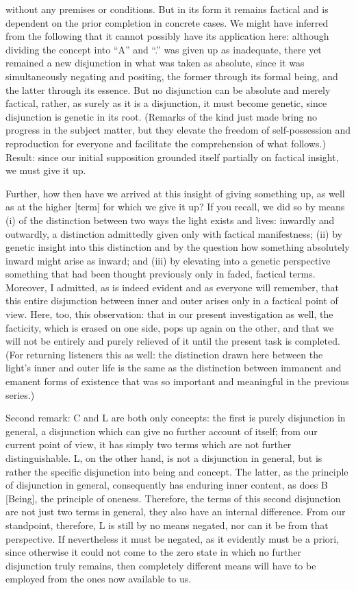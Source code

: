 without any premises or conditions.
But in its form it remains factical and is dependent
on the prior completion in concrete cases.
We might have inferred from the following
that it cannot possibly have its application here:
although dividing the concept
into “A” and “.” was given up as inadequate,
there yet remained a new disjunction
in what was taken as absolute,
since it was simultaneously negating and positing,
the former through its formal being,
and the latter through its essence.
But no disjunction can be absolute and merely factical,
rather, as surely as it is a disjunction,
it must become genetic,
since disjunction is genetic in its root.
(Remarks of the kind just made bring
no progress in the subject matter,
but they elevate the freedom of
self-possession and reproduction for everyone
and facilitate the comprehension of what follows.)
Result: since our initial supposition
grounded itself partially on factical insight,
we must give it up.

Further, how then have we arrived at
this insight of giving something up,
as well as at the higher [term]
for which we give it up?
If you recall, we did so by means
(i) of the distinction between two ways
the light exists and lives: inwardly and outwardly,
a distinction admittedly given only with factical manifestness;
(ii) by genetic insight into this distinction and by the question
how something absolutely inward might arise as inward;
and (iii) by elevating into a genetic perspective
something that had been thought previously
only in faded, factical terms.
Moreover, I admitted, as is indeed evident
and as everyone will remember,
that this entire disjunction between inner and outer
arises only in a factical point of view.
Here, too, this observation:
that in our present investigation as well,
the facticity, which is erased on one side,
pops up again on the other,
and that we will not be entirely and purely relieved of it
until the present task is completed.
(For returning listeners this as well:
the distinction drawn here
between the light’s inner and outer life is
the same as the distinction
between immanent and emanent forms of existence
that was so important and meaningful in the previous series.)

Second remark: C and L are both only concepts:
the first is purely disjunction in general,
a disjunction which can give no further account of itself;
from our current point of view, it has simply two terms which are
not further distinguishable.
L, on the other hand, is not a disjunction in general,
but is rather the specific disjunction into being and concept.
The latter, as the principle of disjunction in general,
consequently has enduring inner content,
as does B [Being], the principle of oneness.
Therefore, the terms of this second disjunction are not
just two terms in general, they also have an internal difference.
From our standpoint, therefore, L is still by no means negated,
nor can it be from that perspective.
If nevertheless it must be negated,
as it evidently must be a priori,
since otherwise it could not come to the zero state
in which no further disjunction truly remains,
then completely different means will have to be employed
from the ones now available to us.

